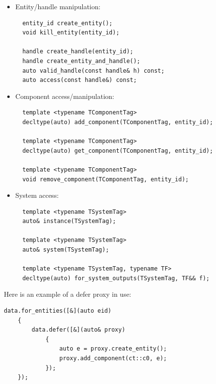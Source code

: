 \documentclass[twoside, 12pt, a4paper, openany]{book}
\begin{document}
\begin{itemize}
\item
  Entity/handle manipulation:

  \begin{verbatim}
  entity_id create_entity();
  void kill_entity(entity_id);

  handle create_handle(entity_id);
  handle create_entity_and_handle();
  auto valid_handle(const handle& h) const;
  auto access(const handle&) const;
  \end{verbatim}
\item
  Component access/manipulation:

  \begin{verbatim}
  template <typename TComponentTag>
  decltype(auto) add_component(TComponentTag, entity_id);

  template <typename TComponentTag>
  decltype(auto) get_component(TComponentTag, entity_id);

  template <typename TComponentTag>
  void remove_component(TComponentTag, entity_id);
  \end{verbatim}
\item
  System access:

  \begin{verbatim}
  template <typename TSystemTag>
  auto& instance(TSystemTag);

  template <typename TSystemTag>
  auto& system(TSystemTag);

  template <typename TSystemTag, typename TF>
  decltype(auto) for_system_outputs(TSystemTag, TF&& f);
  \end{verbatim}
\end{itemize}

Here is an example of a defer proxy in use:

\begin{verbatim}
data.for_entities([&](auto eid)
    {
        data.defer([&](auto& proxy)
            {
                auto e = proxy.create_entity();
                proxy.add_component(ct::c0, e);
            });
    });
\end{verbatim}
\end{document}
